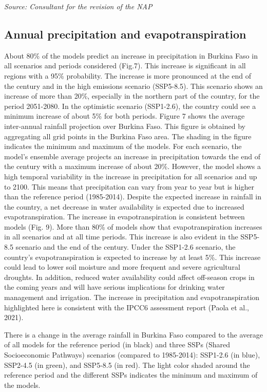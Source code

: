 \documentclass[
]{book}
\begin{document}
\emph{Source: Consultant for the revision of the NAP}

\subsection{Annual precipitation and evapotranspiration}\label{annual-precipitation-and-evapotranspiration}

About 80\% of the models predict an increase in precipitation in Burkina Faso in all scenarios and periods considered (Fig.7). This increase is significant in all regions with a 95\% probability. The increase is more pronounced at the end of the century and in the high emissions scenario (SSP5-8.5). This scenario shows an increase of more than 20\%, especially in the northern part of the country, for the period 2051-2080. In the optimistic scenario (SSP1-2.6), the country could see a minimum increase of about 5\% for both periods. Figure 7 shows the average inter-annual rainfall projection over Burkina Faso. This figure is obtained by aggregating all grid points in the Burkina Faso area. The shading in the figure indicates the minimum and maximum of the models. For each scenario, the model's ensemble average projects an increase in precipitation towards the end of the century with a maximum increase of about 20\%. However, the model shows a high temporal variability in the increase in precipitation for all scenarios and up to 2100. This means that precipitation can vary from year to year but is higher than the reference period (1985-2014). Despite the expected increase in rainfall in the country, a net decrease in water availability is expected due to increased evapotranspiration. The increase in evapotranspiration is consistent between models (Fig. 9). More than 80\% of models show that evapotranspiration increases in all scenarios and at all time periods. This increase is also evident in the SSP5-8.5 scenario and the end of the century. Under the SSP1-2.6 scenario, the country's evapotranspiration is expected to increase by at least 5\%. This increase could lead to lower soil moisture and more frequent and severe agricultural droughts. In addition, reduced water availability could affect off-season crops in the coming years and will have serious implications for drinking water management and irrigation. The increase in precipitation and evapotranspiration highlighted here is consistent with the IPCC6 assessment report (Paola et al., 2021).

There is a change in the average rainfall in Burkina Faso compared to the average of all models for the reference period (in black) and three SSPs (Shared Socioeconomic Pathways) scenarios (compared to 1985-2014): SSP1-2.6 (in blue), SSP2-4.5 (in green), and SSP5-8.5 (in red). The light color shaded around the reference period and the different SSPs indicates the minimum and maximum of the models.
\end{document}
